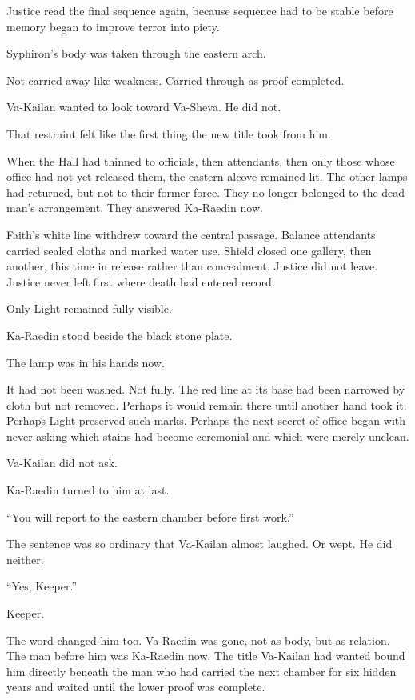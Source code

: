 Justice read the final sequence again, because sequence had to be stable before memory began to improve terror into piety.\par
Syphiron’s body was taken through the eastern arch.\par
Not carried away like weakness.
Carried through as proof completed.\par
Va-Kailan wanted to look toward Va-Sheva.
He did not.\par
That restraint felt like the first thing the new title took from him.\par
When the Hall had thinned to officials, then attendants, then only those whose office had not yet released them, the eastern alcove remained lit.
The other lamps had returned, but not to their former force.
They no longer belonged to the dead man’s arrangement.
They answered Ka-Raedin now.\par
Faith’s white line withdrew toward the central passage.
Balance attendants carried sealed cloths and marked water use.
Shield closed one gallery, then another, this time in release rather than concealment.
Justice did not leave.
Justice never left first where death had entered record.\par
Only Light remained fully visible.\par
Ka-Raedin stood beside the black stone plate.\par
The lamp was in his hands now.\par
It had not been washed.
Not fully.
The red line at its base had been narrowed by cloth but not removed.
Perhaps it would remain there until another hand took it.
Perhaps Light preserved such marks.
Perhaps the next secret of office began with never asking which stains had become ceremonial and which were merely unclean.\par
Va-Kailan did not ask.\par
Ka-Raedin turned to him at last.\par
“You will report to the eastern chamber before first work.”\par
The sentence was so ordinary that Va-Kailan almost laughed.
Or wept.
He did neither.\par
“Yes, Keeper.”\par
Keeper.\par
The word changed him too.
Va-Raedin was gone, not as body, but as relation.
The man before him was Ka-Raedin now.
The title Va-Kailan had wanted bound him directly beneath the man who had carried the next chamber for six hidden years and waited until the lower proof was complete.\par
